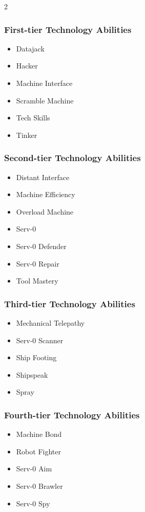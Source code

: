 \begin{multicols}{2}
\subsubsection{First-tier Technology Abilities}

\begin{itemize} 
\item Datajack
\item Hacker
\item Machine Interface
\item Scramble Machine
\item Tech Skills
\item Tinker
\end{itemize}

\subsubsection{Second-tier Technology Abilities}

\begin{itemize}
\item Distant Interface
\item Machine Efficiency
\item Overload Machine
\item Serv-0
\item Serv-0 Defender
\item Serv-0 Repair
\item Tool Mastery
\end{itemize}

\subsubsection{Third-tier Technology Abilities}

\begin{itemize}
\item Mechanical Telepathy
\item Serv-0 Scanner
\item Ship Footing
\item Shipspeak
\item Spray
\end{itemize}

\subsubsection{Fourth-tier Technology Abilities}

\begin{itemize}
\item Machine Bond
\item Robot Fighter
\item Serv-0 Aim
\item Serv-0 Brawler
\item Serv-0 Spy
\end{itemize}


\end{multicols}
